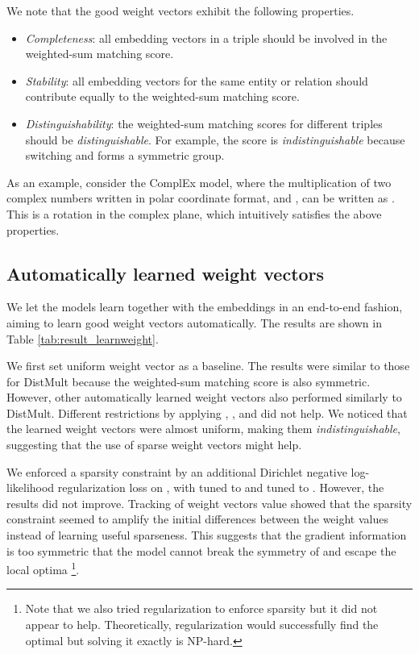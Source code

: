 \documentclass[sigconf,edbt]{acmart-edbt2019}
\begin{document}
We note that the good weight vectors exhibit the following properties.
\begin{itemize}
	\item \textit{Completeness}: all embedding vectors in a triple should be involved in the weighted-sum matching score.
	\item \textit{Stability}: all embedding vectors for the same entity or relation should contribute equally to the weighted-sum matching score.
	\item \textit{Distinguishability}: the weighted-sum matching scores for different triples should be \textit{distinguishable}. For example, the score  is \textit{indistinguishable} because switching  and  forms a symmetric group.
\end{itemize}

As an example, consider the ComplEx model, where the multiplication of two complex numbers written in polar coordinate format,  and , can be written as  \cite{ahlfors_complexanalysisintroduction_1953}. This is a rotation in the complex plane, which intuitively satisfies the above properties.

\subsection{Automatically learned weight vectors} 
We let the models learn  together with the embeddings in an end-to-end fashion, aiming to learn good weight vectors automatically. The results are shown in Table \ref{tab:result_learnweight}.

We first set uniform weight vector as a baseline. The results were similar to those for DistMult because the weighted-sum matching score is also symmetric. However, other automatically learned weight vectors also performed similarly to DistMult. Different restrictions by applying , , and  did not help. We noticed that the learned weight vectors were almost uniform, making them \textit{indistinguishable}, suggesting that the use of sparse weight vectors might help.

We enforced a sparsity constraint by an additional Dirichlet negative log-likelihood regularization loss on , with  tuned to  and  tuned to . However, the results did not improve. Tracking of weight vectors value showed that the sparsity constraint seemed to amplify the initial differences between the weight values instead of learning useful sparseness. This suggests that the gradient information is too symmetric that the model cannot break the symmetry of  and escape the local optima \footnote{Note that we also tried  regularization to enforce sparsity but it did not appear to help. Theoretically,  regularization would successfully find the optimal  but solving it exactly is NP-hard.}.
\end{document}
